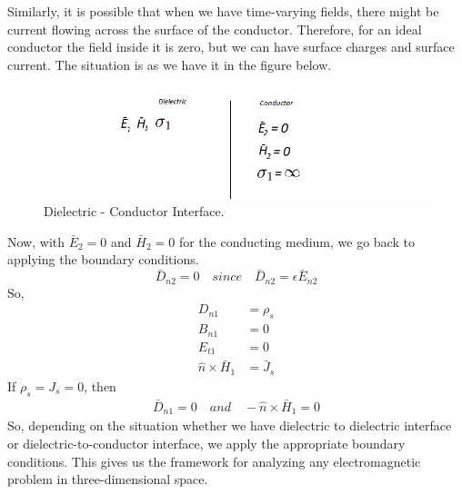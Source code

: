 Similarly, it is possible that when we have time-varying fields, there might be current flowing across the surface of the conductor. Therefore, for an ideal conductor the field inside it is zero, but we can have surface charges and surface current. The situation is as we have it in the figure below.
\begin{figure}[h]
\centering
\includegraphics[width=1.2\linewidth]{graphics/diemedium5_2_2}
\caption{Dielectric - Conductor Interface.}
\end{figure}

Now, with $\bar{E}_2 = 0$ and $\bar{H}_2 = 0$ for the conducting medium, we go back to applying the boundary conditions.
\begin{equation*}
\bar{D}_{n2} = 0\quad since\quad \bar{D}_{n2} = \epsilon\bar{E}_{n2}
\end{equation*}
So,
\begin{align*}
D_{n1} &= \rho_s \\
B_{n1} &= 0 \\
E_{t1} &= 0 \\
\hat{n}\times\bar{H}_1 &= \bar{J}_s
\end{align*}
If $\rho_s = J_s = 0$, then
\begin{align*}
\bar{D}_{n1} = 0\quad and \quad -\hat{n}\times\bar{H}_{1} = 0
\end{align*}
So, depending on the situation whether we have dielectric to dielectric interface or dielectric-to-conductor interface, we apply the appropriate boundary conditions. This gives us the framework for analyzing any electromagnetic problem in three-dimensional space. 

